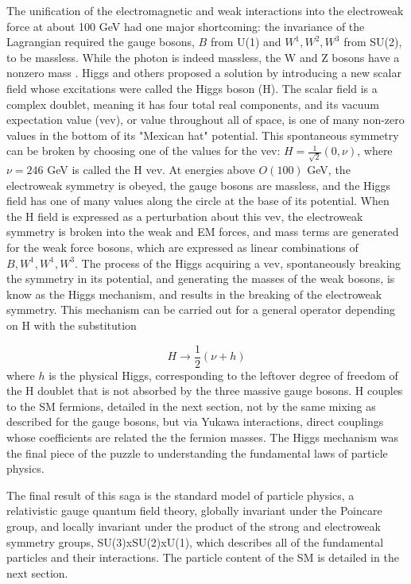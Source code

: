 \indent The unification of the electromagnetic and weak interactions into the electroweak force at about 100 GeV had one major shortcoming: the invariance of the Lagrangian required the gauge bosons, $B$ from U(1) and $W^1, W^2, W^3$ from SU(2), to be massless. While the photon is indeed massless, the W and Z bosons have a nonzero mass \cite{}. Higgs and others \cite{} proposed a solution by introducing a new scalar field whose excitations were called the Higgs boson (H). The scalar field is a complex doublet, meaning it has four total real components, and its vacuum expectation value (vev), or value throughout all of space, is one of many non-zero values in the bottom of its "Mexican hat" potential. This spontaneous symmetry can be broken by choosing one of the values for the vev: $H = \frac{1}{\sqrt{2}} (0, \nu)$, where $\nu=246$ GeV is called the H vev. At energies above $O(100)$ GeV, the electroweak symmetry is obeyed, the gauge bosons are massless, and the Higgs field has one of many values along the circle at the base of its potential. When the H field is expressed as a perturbation about this vev, the electroweak symmetry is broken into the weak and EM forces, and mass terms are generated for the weak force bosons, which are expressed as linear combinations of $B, W^1, W^1, W^3$. The process of the Higgs acquiring a vev, spontaneously breaking the symmetry in its potential, and generating the masses of the weak bosons, is know as the Higgs mechanism, and results in the breaking of the electroweak symmetry. This mechanism can be carried out for a general operator depending on H with the substitution

\begin{equation}
H \rightarrow \frac{1}{2} (\nu + h)
\end{equation}
where $h$ is the physical Higgs, corresponding to the leftover degree of freedom of the H doublet that is not absorbed by the three massive gauge bosons. H couples to the SM fermions, detailed in the next section, not by the same mixing as described for the gauge bosons, but via Yukawa interactions, direct couplings whose coefficients are related the the fermion masses. The Higgs mechanism was the final piece of the puzzle to understanding the fundamental laws of particle physics.
 
\indent The final result of this saga is the standard model of particle physics, a relativistic gauge quantum field theory, globally invariant under the Poincare group, and locally invariant under the product of the strong and electroweak symmetry groups, SU(3)xSU(2)xU(1), which describes all of the fundamental particles and their interactions. The particle content of the SM is detailed in the next section.

